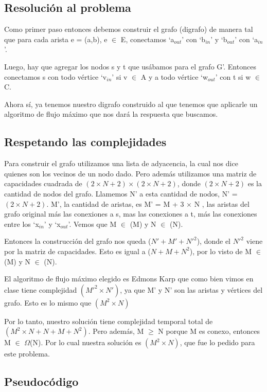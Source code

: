 \subsection{Resolución al problema}

Como primer paso entonces debemos construir el grafo (digrafo) de manera tal que para cada arista e = (a,b), e $\in$ E, conectamos `a$_{out}$' con `b$_{in}$' y `b$_{out}$' con `a$_{in}$'.

Luego, hay que agregar los nodos s y t que usábamos para el grafo G'. Entonces conectamos s con todo vértice `v$_{in}$' si v $\in$ A y a todo vértice `w$_{out}$' con t si w $\in$ C.

Ahora sí, ya tenemos nuestro digrafo construido al que tenemos que aplicarle un algoritmo de flujo máximo que nos dará la respuesta que buscamos.

\subsection{Respetando las complejidades}

Para construir el grafo utilizamos una lista de adyacencia, la cual nos dice quienes son los vecinos de un nodo dado. 
Pero además utilizamos una matriz de capacidades cuadrada de $(2 \times N + 2) \times (2 \times N + 2)$, donde $(2 \times N + 2)$ es la cantidad de nodos del grafo. 
Llamemos N' a esta cantidad de nodos, N' = $(2 \times N + 2)$. M', la cantidad de aristas, es M' = M + 3 $\times$ N , las aristas del grafo original más las conexiones a 
s, mas las conexiones a t, más las conexiones entre los `x$_{in}$' y `x$_{out}$'. Vemos que M $\in$ \bigo(M) y N $\in$ \bigo(N).

Entonces la construcción del grafo nos queda \bigo($N' + M' + N'^2$), donde el $N'^2$ viene por la matriz de capacidades. Esto es igual a \bigo($N + M + N^2$), por lo visto de M $\in$ \bigo(M) y N $\in$ \bigo(N).

El algoritmo de flujo máximo elegido es Edmons Karp que como bien vimos en clase tiene complejidad \bigo$(M'^2 \times N')$, ya que M' y N' son las aristas y vértices del grafo. 
Esto es lo mismo que \bigo$(M^2 \times N)$

Por lo tanto, nuestro solución tiene complejidad temporal total de \bigo$(M^2 \times N + N + M + N^2 )$. Pero además, M $\geq$ N porque M es conexo, entonces M $\in$ $\Omega$(N).
Por lo cual nuestra solución es \bigo$(M^2 \times N )$, que fue lo pedido para este problema.

\subsection{Pseudocódigo}
	
